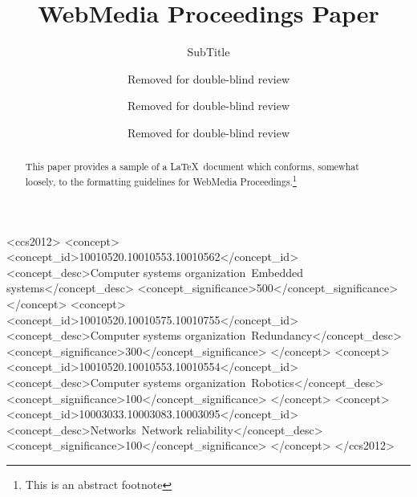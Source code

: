 \documentclass[sigconf]{acmart}
\begin{document}
\title{WebMedia Proceedings Paper}
\subtitle{SubTitle}


\author{Removed for double-blind review}

\author{Removed for double-blind review}

\author{Removed for double-blind review}


\renewcommand{\shortauthors}{Removed for double-blind review}


\begin{abstract}
This paper provides a sample of a \LaTeX\ document which conforms,
somewhat loosely, to the formatting guidelines for
WebMedia Proceedings.\footnote{This is an abstract footnote}
\end{abstract}

%
%
\begin{CCSXML}
<ccs2012>
 <concept>
  <concept_id>10010520.10010553.10010562</concept_id>
  <concept_desc>Computer systems organization~Embedded systems</concept_desc>
  <concept_significance>500</concept_significance>
 </concept>
 <concept>
  <concept_id>10010520.10010575.10010755</concept_id>
  <concept_desc>Computer systems organization~Redundancy</concept_desc>
  <concept_significance>300</concept_significance>
 </concept>
 <concept>
  <concept_id>10010520.10010553.10010554</concept_id>
  <concept_desc>Computer systems organization~Robotics</concept_desc>
  <concept_significance>100</concept_significance>
 </concept>
 <concept>
  <concept_id>10003033.10003083.10003095</concept_id>
  <concept_desc>Networks~Network reliability</concept_desc>
  <concept_significance>100</concept_significance>
 </concept>
</ccs2012>  
\end{CCSXML}
\end{document}

